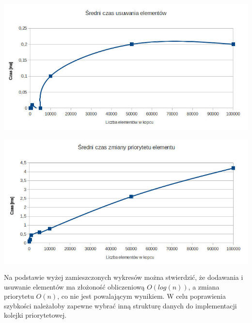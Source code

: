 \documentclass[12pt,a4paper]{article}
\begin{document}
	\includegraphics[scale=0.5]{img/remove.jpg} 

	\includegraphics[scale=0.5]{img/change.jpg} 

Na podstawie wyżej zamieszczonych wykresów można stwierdzić, że dodawania i usuwanie elementów ma złożoność obliczeniową $O(log(n))$, a zmiana priorytetu $O(n)$, co nie jest powalającym wynikiem. W celu poprawienia szybkości należałoby zapewne wybrać inną strukturę danych do implementacji kolejki priorytetowej.
\end{document}
